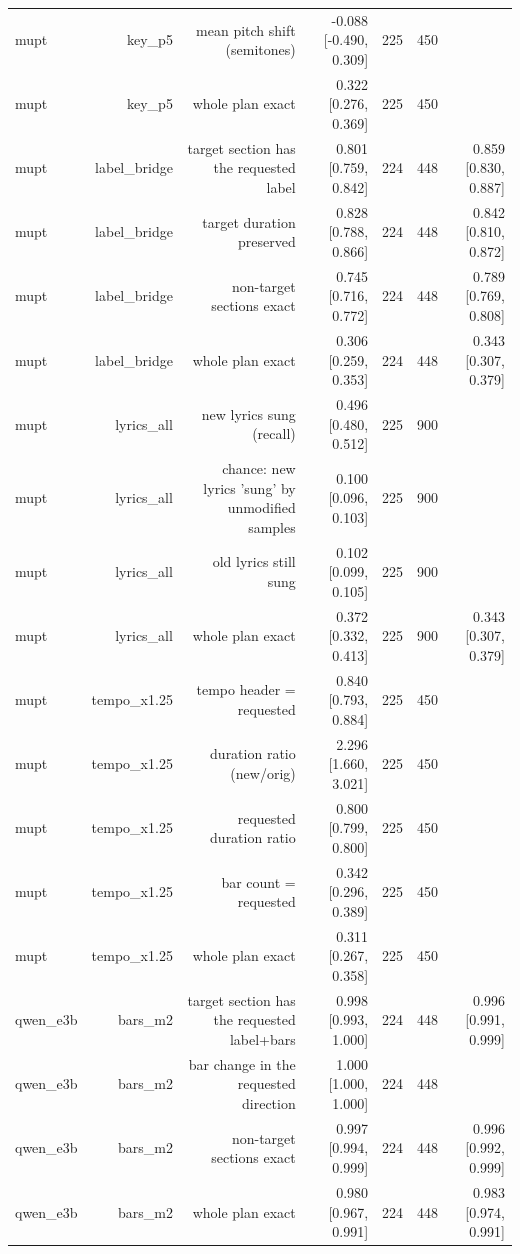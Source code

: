 \begin{table}[t]
\begin{tabular}{lrrrrrr}
mupt & key\_p5 & mean pitch shift (semitones) & -0.088 [-0.490, 0.309] & 225 & 450 &  \\
mupt & key\_p5 & whole plan exact & 0.322 [0.276, 0.369] & 225 & 450 &  \\
mupt & label\_bridge & target section has the requested label & 0.801 [0.759, 0.842] & 224 & 448 & 0.859 [0.830, 0.887] \\
mupt & label\_bridge & target duration preserved & 0.828 [0.788, 0.866] & 224 & 448 & 0.842 [0.810, 0.872] \\
mupt & label\_bridge & non-target sections exact & 0.745 [0.716, 0.772] & 224 & 448 & 0.789 [0.769, 0.808] \\
mupt & label\_bridge & whole plan exact & 0.306 [0.259, 0.353] & 224 & 448 & 0.343 [0.307, 0.379] \\
mupt & lyrics\_all & new lyrics sung (recall) & 0.496 [0.480, 0.512] & 225 & 900 &  \\
mupt & lyrics\_all & chance: new lyrics 'sung' by unmodified samples & 0.100 [0.096, 0.103] & 225 & 900 &  \\
mupt & lyrics\_all & old lyrics still sung & 0.102 [0.099, 0.105] & 225 & 900 &  \\
mupt & lyrics\_all & whole plan exact & 0.372 [0.332, 0.413] & 225 & 900 & 0.343 [0.307, 0.379] \\
mupt & tempo\_x1.25 & tempo header = requested & 0.840 [0.793, 0.884] & 225 & 450 &  \\
mupt & tempo\_x1.25 & duration ratio (new/orig) & 2.296 [1.660, 3.021] & 225 & 450 &  \\
mupt & tempo\_x1.25 & requested duration ratio & 0.800 [0.799, 0.800] & 225 & 450 &  \\
mupt & tempo\_x1.25 & bar count = requested & 0.342 [0.296, 0.389] & 225 & 450 &  \\
mupt & tempo\_x1.25 & whole plan exact & 0.311 [0.267, 0.358] & 225 & 450 &  \\
qwen\_e3b & bars\_m2 & target section has the requested label+bars & 0.998 [0.993, 1.000] & 224 & 448 & 0.996 [0.991, 0.999] \\
qwen\_e3b & bars\_m2 & bar change in the requested direction & 1.000 [1.000, 1.000] & 224 & 448 &  \\
qwen\_e3b & bars\_m2 & non-target sections exact & 0.997 [0.994, 0.999] & 224 & 448 & 0.996 [0.992, 0.999] \\
qwen\_e3b & bars\_m2 & whole plan exact & 0.980 [0.967, 0.991] & 224 & 448 & 0.983 [0.974, 0.991] \\

\end{tabular}
\end{table}
